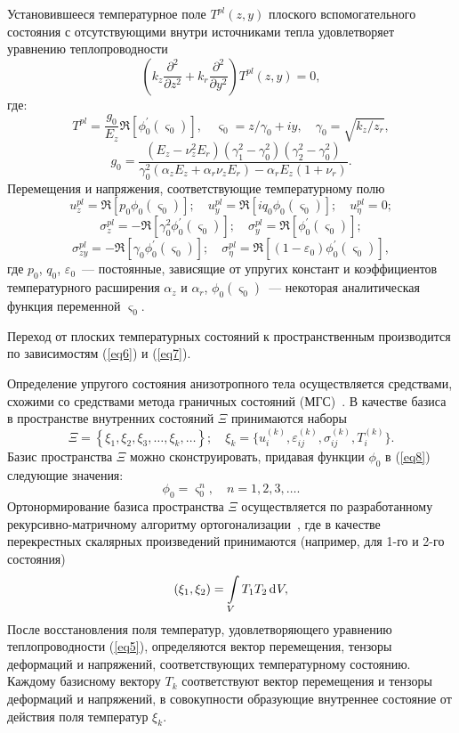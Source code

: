 \documentclass[press]{vestnik}
\begin{document}
Установившееся температурное поле $T^{pl}(z, y)$ плоского вспомогательного 
состояния с отсутствующими внутри источниками тепла удовлетворяет уравнению 
теплопроводности~\cite{B12}
\[
\left( {k_{z} \frac{\partial^{2}}{\partial z^{2}}+k_{r} \frac{\partial 
^{2}}{\partial y^{2}}} \right)T^{pl}(z, y)=0,
\]
где:
\[
T^{pl} =\frac{g_{0} }{E_{z} }\Re[\phi_{0}^{'} \left( {\varsigma_{0} } 
\right)],
\quad
\varsigma_{0} =z/\gamma_{0} +iy,
\quad
\gamma_{0} =\sqrt {k_{z} /z_{r} } ,
\]
\[
g_{0} =\frac{(E_{z} -\nu_{z}^{2} E_{r} )(\gamma_{1}^{2} -\gamma_{0}^{2} 
)(\gamma_{2}^{2} -\gamma_{0}^{2} )}{\gamma_{0}^{2} (\alpha_{z} E_{z} 
+\alpha_{r} \nu_{z} E_{r} )-\alpha_{r} E_{z} (1+\nu_{r} )}.
\]
Перемещения и напряжения, соответствующие температурному полю~\cite{B12}
\[
u_{z}^{pl} =\Re[p_{0} \phi_{0} \left( {\varsigma_{0} } \right)];
\quad
u_{y}^{pl} =\Re[iq_{0} \phi_{0} \left( {\varsigma_{0} } \right)];
\quad
u_{\eta }^{pl} =0;
\]
\begin{equation}
\label{eq8}
\sigma_{z}^{pl} =-\Re[\gamma_{0}^{2} \phi_{0}^{'} \left( {\varsigma_{0} } 
\right)];
\quad
\sigma_{y}^{pl} =\Re[\phi_{0}^{'} \left( {\varsigma_{0} } \right)];
\end{equation}
\[
\sigma_{zy}^{pl} =-\Re[\gamma_{0} \phi_{0}^{'} \left( {\varsigma_{0} } 
\right)];
\quad
\sigma_{\eta }^{pl} =\Re[\left( {1-\varepsilon_{0} } \right)\phi_{0}^{'} 
\left( {\varsigma_{0} } \right)],
\]
где $p_{0} $, $q_{0} $, $\varepsilon_{0} $~--- постоянные, зависящие от 
упругих констант и коэффициентов температурного расширения $\alpha_{z} $ и 
$\alpha_{r} $, $\phi_{0} \left( {\varsigma_{0} } \right)$~--- некоторая 
аналитическая функция переменной $\varsigma_{0} $.

Переход от плоских температурных состояний к пространственным производится 
по зависимостям (\ref{eq6}) и (\ref{eq7}).

Определение упругого состояния анизотропного тела осуществляется средствами, 
схожими со средствами метода граничных состояний (МГС)~\cite{B14}. В качестве 
базиса в пространстве внутренних состояний $\Xi $ принимаются наборы
\[
\Xi =\left\{ {\xi_{1} , \xi_{2} , \xi_{3} ,\ldots,\xi_{k} ,\ldots} 
\right\};
\quad
\xi_{k} =\{u_{i}^{(k)} ,\varepsilon_{ij}^{(k)} ,\sigma_{ij}^{(k)} 
,T_{i}^{(k)} \}.
\]
Базис пространства $\Xi $ можно сконструировать, придавая функции $\phi_{0} 
$ в (\ref{eq8}) следующие значения:
\[
\phi_{0} =\varsigma_{0}^{n} ,
\quad
n=1, 2, 3,\ldots.
\]
Ортонормирование базиса пространства $\Xi $ осуществляется по разработанному 
рекурсивно-матричному алгоритму ортогонализации~\cite{B15}, где в качестве 
перекрестных скалярных произведений принимаются (например, для 1-го и 2-го 
состояния)
\[
(\xi_{1} ,\xi_{2} )=\int\limits_V {T_{1} } T_{2} \d V,
\]
После восстановления поля температур, удовлетворяющего уравнению 
теплопроводности (\ref{eq5}), определяются вектор перемещения, тензоры деформаций и 
напряжений, соответствующих температурному состоянию. Каждому базисному 
вектору $T_{k} $ соответствуют вектор перемещения и тензоры деформаций и 
напряжений, в совокупности образующие внутреннее состояние от действия поля 
температур $\xi_{k} $.
\end{document}
